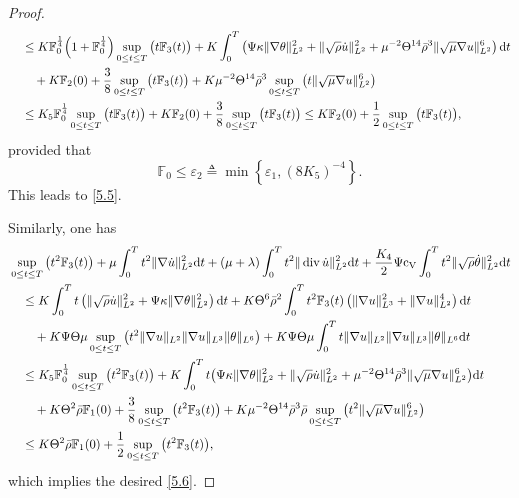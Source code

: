 \documentclass[11pt]{article}
\DeclareMathOperator{\divv}{div}
\newcommand{\na}{\nabla}
\begin{document}
\begin{proof}
\begin{align*}
& \quad \leq  K \mathbb{F}_0^{\frac{1}{4}} \Big(1 + \mathbb{F}_0^{\frac{1}{4}} \Big) \sup_{0 \leq t \leq T}\big(t \mathbb{F}_3 (t)\big)+ K \int^T_0 \left( \Psi \kappa \|\na \theta\|_{L^2}^2 + \|\sqrt{\rho} \dot{u}\|_{L^2}^2 + \mu^{-2} \Theta^{14} \bar{\rho}^3 \|\sqrt{\mu}\na u\|_{L^2}^6 \right) {\rm d} t\\
& \qquad + K \mathbb{F}_2 (0) + \frac{3}{8} \sup_{0 \leq t \leq T}\big(t \mathbb{F}_3 (t)\big) + K \mu^{-2} \Theta^{14} \bar{\rho}^3 \sup_{0 \leq t \leq T} \big(t \|\sqrt{\mu} \na u\|_{L^2}^6 \big) \\
& \quad \leq  K_5 \mathbb{F}_0^{\frac{1}{4}} \sup_{0 \leq t \leq T}\big(t \mathbb{F}_3 (t)\big)+ K \mathbb{F}_2 (0) + \frac{3}{8} \sup_{0 \leq t \leq T}\big(t \mathbb{F}_3 (t)\big)\leq K \mathbb{F}_2 (0) + \frac{1}{2} \sup_{0 \leq t \leq T}\big(t \mathbb{F}_3 (t)\big),
\end{align*}
provided that
$$
\mathbb{F}_0 \leq \varepsilon_2 \triangleq \min \left\{\varepsilon_1, (8 K_5)^{-4} \right\}.
$$
This leads to \eqref{5.5}.

Similarly, one has
\begin{align*}
& \sup_{0 \leq t \leq T}\big(t^2 \mathbb{F}_3(t)\big)+ \mu \int^T_0 t^2 \|\na \dot{u}\|_{L^2}^2 {\rm d} t + \left( \mu + \lambda \right) \int^T_0 t^2 \|\divv \dot{u}\|_{L^2}^2 {\rm d} t + \frac{K_4}{2} \Psi {\rm c_V} \int^T_0 t^2 \|\sqrt{\rho} \dot{\theta}\|_{L^2}^2 {\rm d} t \\
& \quad \leq K \int^T_0 t \left(\|\sqrt{\rho} \dot{u}\|_{L^2}^2 + \Psi \kappa \|\na \theta\|_{L^2}^2 \right) {\rm d} t + K \Theta^6 \bar{\rho}^2 \int^T_0 t^2 \mathbb{F}_3 (t) \left(\|\na u\|_{L^3}^2 + \|\na u\|_{L^2}^4 \right) {\rm d} t\\
& \qquad + K \Psi \Theta \mu \sup_{0 \leq t \leq T}\big(t^2 \|\na u\|_{L^2} \|\na u\|_{L^3} \|\theta\|_{L^6}\big)+ K \Psi \Theta \mu \int^T_0 t \|\na u\|_{L^2} \|\na u\|_{L^3} \|\theta\|_{L^6} {\rm d} t\\
& \quad \leq  K_5 \mathbb{F}_0^{\frac{1}{4}} \sup_{0 \leq t \leq T}\big(t^2 \mathbb{F}_3 (t)\big)+ K \int^T_0 t \big( \Psi \kappa \|\na \theta\|_{L^2}^2 + \|\sqrt{\rho} \dot{u}\|_{L^2}^2 + \mu^{-2} \Theta^{14} \bar{\rho}^3 \| \sqrt{\mu} \na u\|_{L^2}^6 \big) {\rm d} t\\
& \qquad + K \Theta^2 \bar{\rho} \mathbb{F}_1 (0) + \frac{3}{8} \sup_{0 \leq t \leq T} \big(t^2 \mathbb{F}_3 (t)\big)+ K \mu^{-2} \Theta^{14} \bar{\rho}^3 \bar{\rho} \sup_{0 \leq t \leq T}\big(t^2 \|\sqrt{\mu}\na u\|_{L^2}^6\big) \\
& \quad \leq K \Theta^2 \bar{\rho} \mathbb{F}_1 (0) + \frac12\sup_{0 \leq t \leq T}\big(t^2 \mathbb{F}_3 (t)\big),
\end{align*}
which implies the desired \eqref{5.6}.


\end{proof}
\end{document}
